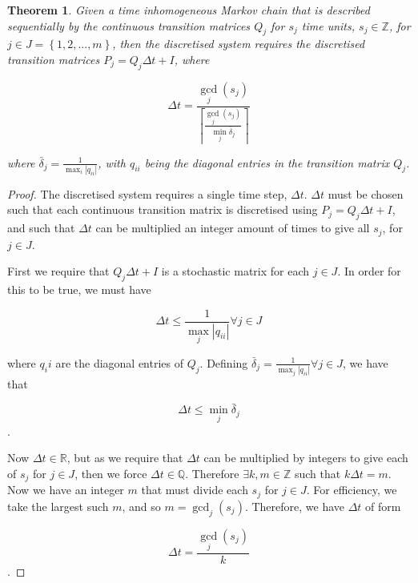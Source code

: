 \documentclass{article}
\newtheorem{theorem}{Theorem}
\begin{document}
\begin{theorem}\label{thrm:discretisetimeinhomogeneousmarkovchains}
Given a time inhomogeneous Markov chain that is described sequentially by the continuous transition matrices $Q_j$ for $s_j$ time units, $s_j \in \mathbb{Z}$, for $j \in J = \left\{ 1, 2, ..., m \right\}$, then the discretised system requires the discretised transition matrices $P_j = Q_j \Delta t + I$, where

$$
\Delta t = \frac{\gcd_j(s_j)}{\left\lceil \frac{\gcd_j(s_j)}{\min_j \bar{\delta}_j} \right\rceil}
$$

where $\bar{\delta}_j = \frac{1}{\max_i |q_{ii}|}$, with $q_{ii}$ being the diagonal entries in the transition matrix $Q_j$.
\end{theorem}

\begin{proof}
The discretised system requires a single time step, $\Delta t$.
$\Delta t$ must be chosen such that each continuous transition matrix is discretised using $P_j = Q_j \Delta t + I$, and such that $\Delta t$ can be multiplied an integer amount of times to give all $s_j$, for $j \in J$.

First we require that $Q_j \Delta t + I$ is a stochastic matrix for each $j \in J$.
In order for this to be true, we must have

\begin{equation*}
\Delta t \leq \frac{1}{\max_j |q_{ii}|} \forall j \in J
\end{equation*}

where $q_ii$ are the diagonal entries of $Q_j$.
Defining $\bar{\delta}_j = \frac{1}{\max_j |q_{ii}|} \forall j \in J$, we have that

\begin{equation}\label{eqn:cond1}
\Delta t \leq \min_j \bar{\delta}_j
\end{equation}.

Now $\Delta t \in \mathbb{R}$, but as we require that $\Delta t$ can be multiplied by integers to give each of $s_j$ for $j \in J$, then we force $\Delta t \in \mathbb{Q}$.
Therefore $\exists k, m \in \mathbb{Z}$ such that $k \Delta t = m$.
Now we have an integer $m$ that must divide each $s_j$ for $j \in J$.
For efficiency, we take the largest such $m$, and so $m = \gcd_j (s_j)$.
Therefore, we have $\Delta t$ of form

\begin{equation}\label{eqn:cond2}
\Delta t = \frac{\gcd_j(s_j)}{k}
\end{equation}.


\end{proof}
\end{document}
